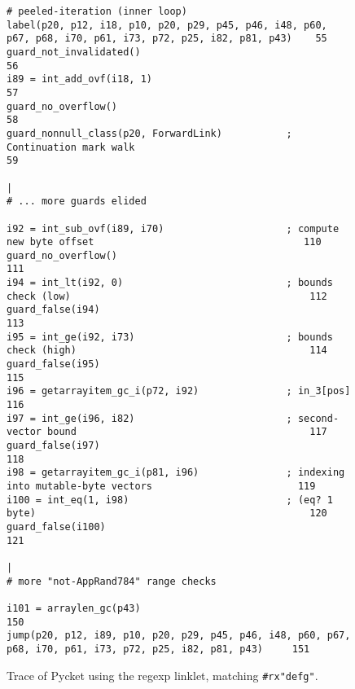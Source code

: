 \begin{figure}[!htbp]
\begin{lstlisting}[style=rptrace-style]
# peeled-iteration (inner loop)
label(p20, p12, i18, p10, p20, p29, p45, p46, i48, p60, p67, p68, i70, p61, i73, p72, p25, i82, p81, p43)    55
guard_not_invalidated()                                                                                      56
i89 = int_add_ovf(i18, 1)                                                                                    57
guard_no_overflow()                                                                                          58
guard_nonnull_class(p20, ForwardLink)           ; Continuation mark walk                                     59
                                                                                                             |
# ... more guards elided

i92 = int_sub_ovf(i89, i70)                     ; compute new byte offset                                    110
guard_no_overflow()                                                                                          111
i94 = int_lt(i92, 0)                            ; bounds check (low)                                         112
guard_false(i94)                                                                                             113
i95 = int_ge(i92, i73)                          ; bounds check (high)                                        114
guard_false(i95)                                                                                             115
i96 = getarrayitem_gc_i(p72, i92)               ; in_3[pos]                                                  116
i97 = int_ge(i96, i82)                          ; second-vector bound                                        117
guard_false(i97)                                                                                             118
i98 = getarrayitem_gc_i(p81, i96)               ; indexing into mutable-byte vectors                         119
i100 = int_eq(1, i98)                           ; (eq? 1 byte)                                               120
guard_false(i100)                                                                                            121
                                                                                                             |
# more "not-AppRand784" range checks

i101 = arraylen_gc(p43)                                                                                      150
jump(p20, p12, i89, p10, p20, p29, p45, p46, i48, p60, p67, p68, i70, p61, i73, p72, p25, i82, p81, p43)     151
\end{lstlisting}

\caption{\small Trace of Pycket using the regexp linklet, matching
		{\tt\#rx"defg"}.}
\label{fig:regexp-linklet-big-trace}
\end{figure}